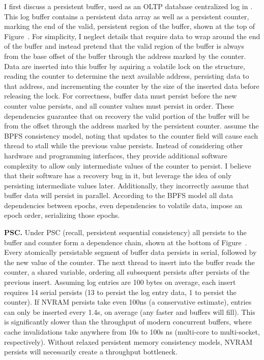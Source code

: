 



I first discuss a persistent buffer, used as an OLTP database centralized log in .
This log buffer contains a persistent data array as well as a persistent counter, marking the end of the valid, persistent region of the buffer, shown at the top of Figure~.
For simplicity, I neglect details that require data to wrap around the end of the buffer and instead pretend that the valid region of the buffer is always from the base offset of the buffer through the address marked by the counter.
Data are inserted into this buffer by aquiring a volatile lock on the structure, reading the counter to determine the next available address, persisting data to that address, and incrementing the counter by the size of the inserted data before releasing the lock.
For correctness, buffer data must persist before the new counter value persists, and all counter values must persist in order.
These dependencies guarantee that on recovery the valid portion of the buffer will be from the offset through the address marked by the persistent counter.
 assume the BPFS consistency model, noting that updates to the counter field will cause each thread to stall while the previous value persists.
Instead of considering other hardware and programming interfaces, they provide additional software complexity to allow only intermediate values of the counter to persist.
I believe that their software has a recovery bug in it, but leverage the idea of only persisting intermediate values later.
Additionally, they incorrectly assume that buffer data will persist in parallel.
According to the BPFS model all data dependencies between epochs, even dependencies to volatile data, impose an epoch order, serializing those epochs.

\textbf{PSC.} Under PSC (recall, persistent sequential consistency) all persists to the buffer and counter form a dependence chain, shown at the bottom of Figure~.
Every atomically persistable segment of buffer data persists in serial, followed by the new value of the counter.
The next thread to insert into the buffer reads the counter, a shared variable, ordering all subsequent persists after persists of the previous insert.
Assuming log entries are 100 bytes on average, each insert requires 14 serial persists (13 to persist the log entry data, 1 to persist the counter).
If NVRAM persists take even 100ns (a conservative estimate), entries can only be inserted every 1.4\textmu s, on average (any faster and buffers will fill).
This is significantly slower than the throughput of modern concurrent buffers, where cache invalidations take anywhere from 10s to 100s ns (multi-core to multi-socket, respectively).
Without relaxed persistent memory consistency models, NVRAM persists will necessarily create a throughput bottleneck.

